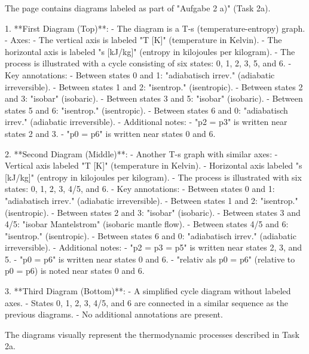 The page contains diagrams labeled as part of "Aufgabe 2 a)" (Task 2a).  

1. **First Diagram (Top)**:  
   - The diagram is a T-s (temperature-entropy) graph.  
   - Axes:  
     - The vertical axis is labeled "T [K]" (temperature in Kelvin).  
     - The horizontal axis is labeled "s [kJ/kg]" (entropy in kilojoules per kilogram).  
   - The process is illustrated with a cycle consisting of six states: 0, 1, 2, 3, 5, and 6.  
   - Key annotations:  
     - Between states 0 and 1: "adiabatisch irrev." (adiabatic irreversible).  
     - Between states 1 and 2: "isentrop." (isentropic).  
     - Between states 2 and 3: "isobar" (isobaric).  
     - Between states 3 and 5: "isobar" (isobaric).  
     - Between states 5 and 6: "isentrop." (isentropic).  
     - Between states 6 and 0: "adiabatisch irrev." (adiabatic irreversible).  
   - Additional notes:  
     - "p2 = p3" is written near states 2 and 3.  
     - "p0 = p6" is written near states 0 and 6.  

2. **Second Diagram (Middle)**:  
   - Another T-s graph with similar axes:  
     - Vertical axis labeled "T [K]" (temperature in Kelvin).  
     - Horizontal axis labeled "s [kJ/kg]" (entropy in kilojoules per kilogram).  
   - The process is illustrated with six states: 0, 1, 2, 3, 4/5, and 6.  
   - Key annotations:  
     - Between states 0 and 1: "adiabatisch irrev." (adiabatic irreversible).  
     - Between states 1 and 2: "isentrop." (isentropic).  
     - Between states 2 and 3: "isobar" (isobaric).  
     - Between states 3 and 4/5: "isobar Mantelstrom" (isobaric mantle flow).  
     - Between states 4/5 and 6: "isentrop." (isentropic).  
     - Between states 6 and 0: "adiabatisch irrev." (adiabatic irreversible).  
   - Additional notes:  
     - "p2 = p3 = p5" is written near states 2, 3, and 5.  
     - "p0 = p6" is written near states 0 and 6.  
     - "relativ als p0 = p6" (relative to p0 = p6) is noted near states 0 and 6.  

3. **Third Diagram (Bottom)**:  
   - A simplified cycle diagram without labeled axes.  
   - States 0, 1, 2, 3, 4/5, and 6 are connected in a similar sequence as the previous diagrams.  
   - No additional annotations are present.  

The diagrams visually represent the thermodynamic processes described in Task 2a.